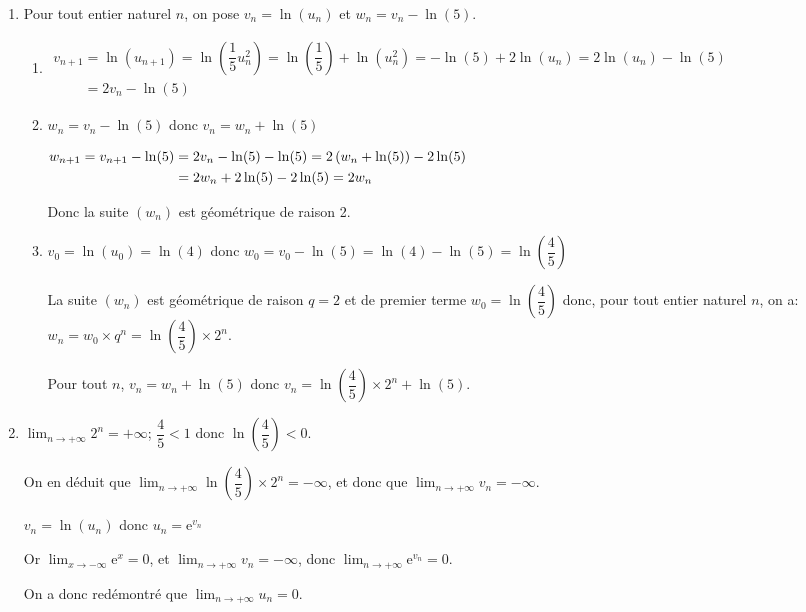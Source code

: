 \documentclass[10pt]{article}
\providecommand{\e}{{\mathrm{e}}}
\providecommand{\ds}{\displaystyle}
\begin{document}
\begin{enumerate}
\begin{enumerate}
	\end{enumerate}
\item Pour tout entier naturel $n$, on pose $v_n = \ln \left(u_n\right)$ et $w_n = v_n - \ln (5)$.
	\begin{enumerate}
		\item 
$\begin{gathered}v_{n+1} = \ln \left (u_{n+1}\right ) = \ln \left (\dfrac{1}{5}u_n^2\right )
= \ln \left ( \dfrac{1}{5}\right ) + \ln \left ( u_n^2 \right )
= - \ln \left (5\right ) +2 \ln \left (u_n\right )
=2 \ln\left (u_n\right ) -\ln \left (5\right )\\
\phantom{v_{n+1}}
=2 v_n -\ln \left (5\right )\end{gathered}$		
		
		\item 
$w_n = v_n - \ln (5)$ donc $v_n=w_n+ \ln(5)$

$\begin{gathered}w_{n+1} =v_{n+1} - \ln(5) = 2 v_n -\ln(5) -\ln(5)
= 2\left (w_n +\ln(5)\mathstrut\right ) -2\ln(5)\\
\phantom{w_{n+1}}
=2 w_n +2\ln(5)-2\ln(5)=2w_n\end{gathered}$		
		
Donc la suite $\left(w_n\right)$ est géométrique de raison 2.
		
		\item 
$v_0=\ln\left (u_0\right )=\ln(4)$ donc $w_0=v_0-\ln(5)=\ln(4)-\ln(5) = \ln \left (\dfrac{4}{5}\right )$

La suite $(w_n)$ est géométrique de raison $q=2$ et de premier terme $w_0=\ln\left (\dfrac{4}{5}\right )$ donc, pour tout entier naturel $n$, on a:
$w_n=w_0\times q^n = \ln\left (\dfrac{4}{5}\right ) \times 2^n$.

Pour tout $n$, $v_n=w_n +\ln(5)$ donc $v_n = \ln\left (\dfrac{4}{5}\right )\times 2^n +\ln(5)$.		
			\end{enumerate}
			
\item 
$\ds\lim_{n\to +\infty} 2^n=+\infty$;
$\dfrac{4}{5}<1$ donc $\ln\left (\dfrac{4}{5}\right )<0$.

On en déduit que $\ds\lim_{n\to +\infty} \ln\left (\dfrac{4}{5}\right )\times 2^n=-\infty$, et donc que $\ds\lim_{n\to +\infty} v_n=-\infty$.

$v_n=\ln\left (u_n\right )$ donc $u_n=\e^{v_n}$

Or $\ds\lim_{x\to -\infty} \e^{x}=0$, et $\ds\lim_{n\to +\infty} v_n=-\infty$, donc $\ds\lim_{n\to +\infty} \e^{v_n}=0$.

On a donc redémontré que $\ds\lim_{n\to +\infty} u_n=0$.


\end{enumerate}

\vspace{0.5cm}
\end{document}
